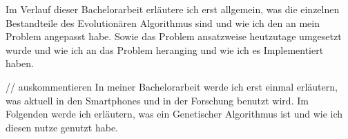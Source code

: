 
Im Verlauf dieser Bachelorarbeit erläutere ich erst allgemein, was die einzelnen Bestandteile des Evolutionären Algorithmus sind und wie ich den an mein Problem angepasst habe. Sowie das Problem ansatzweise heutzutage umgesetzt wurde und wie ich an das Problem heranging und wie ich es Implementiert haben.

// auskommentieren
In meiner Bachelorarbeit werde ich erst einmal erläutern, was aktuell in den Smartphones und in der Forschung benutzt wird.
Im Folgenden werde ich erläutern, was ein Genetischer Algorithmus ist und wie ich diesen nutze genutzt habe. 